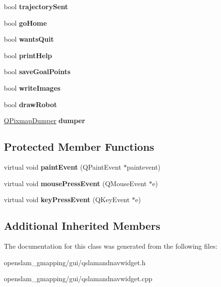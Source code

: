 \begin{DoxyCompactItemize}
\mbox{\label{classQSLAMandNavWidget_af589806c6fd3015eef04e2575fd2e700}} 
bool {\bfseries trajectory\+Sent}
\item 
\mbox{\label{classQSLAMandNavWidget_a3b8c3733d0bca7c19a15f0ccebe2b7d7}} 
bool {\bfseries go\+Home}
\item 
\mbox{\label{classQSLAMandNavWidget_afa7fac60247ddbc235c73877c721fd2d}} 
bool {\bfseries wants\+Quit}
\item 
\mbox{\label{classQSLAMandNavWidget_a6660f7ee95e7b8ad641d03f3b7a75051}} 
bool {\bfseries print\+Help}
\item 
\mbox{\label{classQSLAMandNavWidget_af566d9264d30ca31556f4128684a8082}} 
bool {\bfseries save\+Goal\+Points}
\item 
\mbox{\label{classQSLAMandNavWidget_a0beb870f864900c90551b0863b2fd3eb}} 
bool {\bfseries write\+Images}
\item 
\mbox{\label{classQSLAMandNavWidget_a93c04395d4d368115e093cd0ef9932e6}} 
bool {\bfseries draw\+Robot}
\item 
\mbox{\label{classQSLAMandNavWidget_aa8b29168c7a1a1c6ae423a8fc7f1c1e5}} 
\hyperlink{structQPixmapDumper}{Q\+Pixmap\+Dumper} {\bfseries dumper}
\end{DoxyCompactItemize}
\subsection*{Protected Member Functions}
\begin{DoxyCompactItemize}
\item 
\mbox{\label{classQSLAMandNavWidget_a52033eb6d1662536bd9cd546fa3257ab}} 
virtual void {\bfseries paint\+Event} (Q\+Paint\+Event $\ast$paintevent)
\item 
\mbox{\label{classQSLAMandNavWidget_aebce905ec1d25c3431a4351b2d74cbee}} 
virtual void {\bfseries mouse\+Press\+Event} (Q\+Mouse\+Event $\ast$e)
\item 
\mbox{\label{classQSLAMandNavWidget_a87756a11968a6ae16cb71251c3a35893}} 
virtual void {\bfseries key\+Press\+Event} (Q\+Key\+Event $\ast$e)
\end{DoxyCompactItemize}
\subsection*{Additional Inherited Members}


The documentation for this class was generated from the following files\+:\begin{DoxyCompactItemize}
\item 
openslam\+\_\+gmapping/gui/qslamandnavwidget.\+h\item 
openslam\+\_\+gmapping/gui/qslamandnavwidget.\+cpp\end{DoxyCompactItemize}
